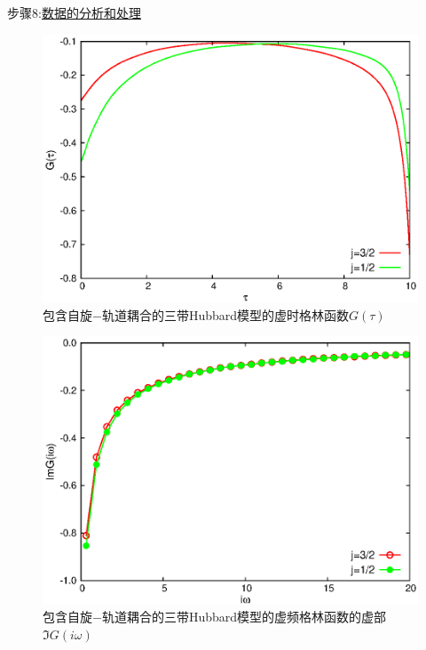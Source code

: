 步骤8:\underline{数据的分析和处理}

\begin{figure}
\centering
\includegraphics{figure/green-t822.eps}
\caption{包含自旋$-$轨道耦合的三带Hubbard模型的虚时格林函数$G(\tau)$} 
\label{fig:green-t822}
\end{figure}

\begin{figure}
\centering
\includegraphics{figure/grn-t822.eps}
\caption{包含自旋$-$轨道耦合的三带Hubbard模型的虚频格林函数的虚部$\Im G(i\omega)$} 
\label{fig:grn-t822}
\end{figure}

